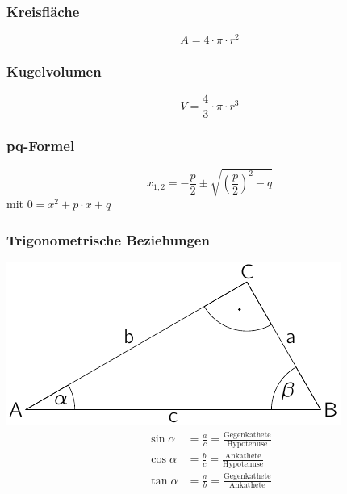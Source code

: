 
\subsubsection{Kreisfläche}
\begin{equation}\label{eq:mathematik:kreisflaeche}
 A = 4\cdot \pi \cdot r^2
\end{equation}

\subsubsection{Kugelvolumen}
\begin{equation}\label{eq:mathematik:kugelvolumen}
 V = \frac{4}{3}\cdot\pi\cdot r^3
\end{equation}

\subsubsection{pq-Formel}
\begin{equation}\label{eq:mathematik:quadratische:gleichung:pq}
x_{1,2} = - \frac{p}{2} \pm \sqrt{ \left(\frac{p}{2}\right)^2 - q }
\end{equation}
mit $ 0 = x^2 + p \cdot x + q $

\subsubsection{Trigonometrische Beziehungen}
\includegraphics[width=0.6\linewidth]{trigonometrie} \hfill
\begin{align}
\sin\alpha &= \frac{a}{c} = \frac{\text{Gegenkathete}}{\text{Hypotenuse}}\\
\cos\alpha &= \frac{b}{c} = \frac{\text{Ankathete}}{\text{Hypotenuse}}\\
\tan\alpha  &= \frac{a}{b} = \frac{\text{Gegenkathete}}{\text{Ankathete}}
\end{align}
